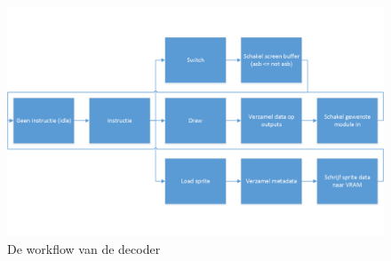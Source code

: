 \documentclass{scrartcl} %
\begin{document}
\begin{figure}[H]
	\centering
	\includegraphics[width=\textwidth]{resource/decoder-flow.png}
	\caption{De workflow van de decoder}
	\label{fig:decoder-flow}
\end{figure}

\end{document}
